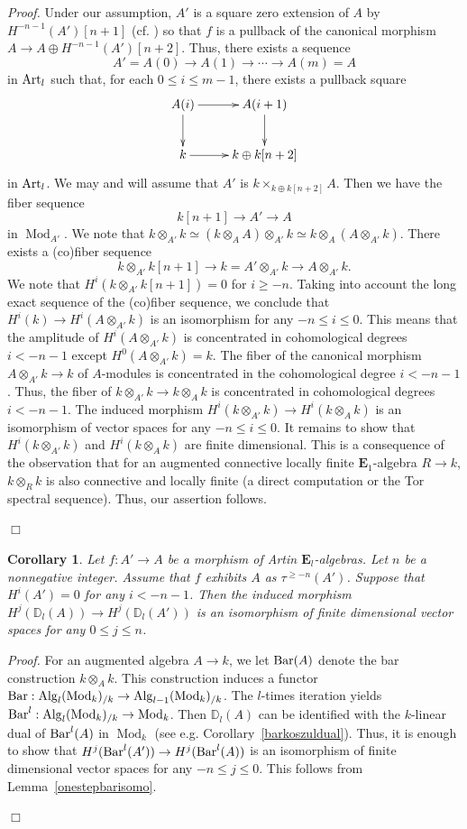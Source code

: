 \documentclass[leqno,12pt]{amsart}
\theoremstyle{plain}
\newtheorem{Corollary}[Theorem]{Corollary}
\theoremstyle{definition}
\newcommand{\DD}{\mathbb{D}}
\newcommand{\Mod}{\operatorname{Mod}}
\newcommand{\Alg}{\operatorname{Alg}}
\newcommand{\eone}{\mathbf{E}_1}
\newcommand{\Proof}{{\sl Proof.}\quad}
\newcommand{\QED}{{\unskip\nobreak\hfil\penalty50\quad\null\nobreak\hfil
{$\Box$}\parfillskip0pt\finalhyphendemerits0\par\medskip}}
\begin{document}
\Proof
Under our assumption, $A'$ is a square zero extension of $A$ by $H^{-n-1}(A')[n+1]$ (cf. \cite[7.4.1.28]{HA})
so that $f$ is a pullback of the canonical morphism $A\to A\oplus H^{-n-1}(A')[n+2]$.
Thus, there exists a sequence
\[
A'=A(0)\to A(1)\to \cdots \to A(m)=A
\]
in $\textup{Art}_l$
such that,
for each $0\le i\le m-1$,
there exists a pullback square
\[
\xymatrix{
A(i) \ar[r] \ar[d] & A(i+1) \ar[d] \\
k \ar[r] &  k\oplus k[n+2]
}
\]
in $\textup{Art}_l$.
We may and will assume that 
$A'$ is $k\times_{k\oplus k[n+2]} A$.
Then we have the fiber sequence
\[
k[n+1]\to A'\to A
\]
in $\Mod_{A'}$.
We note that $k\otimes_{A'}k\simeq (k\otimes_AA)\otimes_{A'}k\simeq k\otimes_A(A\otimes_{A'}k)$.
There exists a (co)fiber sequence
\[
k\otimes_{A'}k[n+1] \to k=A'\otimes_{A'}k\to A\otimes_{A'}k.
\]
We note that
$H^i(k\otimes_{A'}k[n+1])=0$ for $i\ge -n$.
Taking into account the long exact sequence of the (co)fiber sequence,
we conclude that 
$H^i(k)\to H^i(A\otimes_{A'}k)$ is an isomorphism for any $-n\le i\le 0$.
This means that the amplitude of $H^i(A\otimes_{A'}k)$ is concentrated in cohomological degrees $i<-n-1$ except $H^0(A\otimes_{A'}k)=k$. 
The fiber of the canonical morphism $A\otimes_{A'}k\to k$ of $A$-modules is concentrated in the cohomological degree 
 $i<-n-1$. Thus, the fiber of $k\otimes_{A'}k\to k\otimes_Ak$
  is concentrated in cohomological degrees $i<-n-1$. 
The induced morphism $H^i(k\otimes_{A'}k)\to H^i(k\otimes_Ak)$ is an isomorphism of vector spaces for any $-n\le i\le 0$.
It remains to show that $H^i(k\otimes_{A'}k)$ and $H^i(k\otimes_Ak)$ are finite dimensional.
This is a consequence of the observation that for an augmented connective locally finite $\eone$-algebra $R\to k$,
$k\otimes_Rk$ is also connective and locally finite (a direct computation or the Tor spectral sequence).
Thus, our assertion follows.
\QED

\begin{Corollary}
\label{onestepcor}
Let $f:A'\to A$ be a morphism of Artin $\mathbf{E}_l$-algebras.
Let $n$ be a nonnegative integer.
Assume that $f$ exhibits $A$ as $\tau^{\ge -n}(A')$. 
Suppose that $H^{i}(A')=0$ for any $i<-n-1$.
Then the induced morphism $H^{j}(\DD_l(A))\to H^{j}(\DD_l(A'))$  is an isomorphism of finite dimensional vector spaces for any $0\le j\le n$.
\end{Corollary}

\Proof
For an augmented algebra $A\to k$, we let $\textup{Bar}(A)$ denote the bar construction $k\otimes_Ak$.
This construction induces a functor $\textup{Bar}:\Alg_l(\Mod_k)_{/k}\to \Alg_{l-1}(\Mod_k)_{/k}$. 
The $l$-times iteration yields $\textup{Bar}^l:\Alg_l(\Mod_k)_{/k}\to \Mod_k$.
Then $\DD_l(A)$ can be identified with the $k$-linear dual of $\textup{Bar}^l(A)$ in $\Mod_k$ (see e.g. Corollary~\ref{barkoszuldual}).
Thus, it is enough to show that $H^{j}(\textup{Bar}^l(A'))\to H^{j}(\textup{Bar}^l(A))$
is an isomorphism of finite dimensional vector spaces for any $-n\le j\le 0$.
This follows from Lemma~\ref{onestepbarisomo}.
\QED
\end{document}
